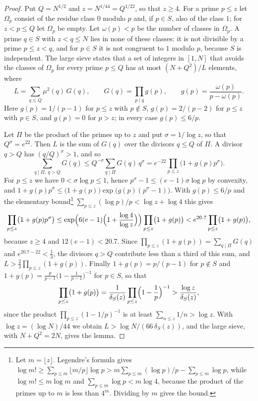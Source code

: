 \documentclass[screen,reqno]{aomart}
\numberwithin{equation}{section}
\theoremstyle{plain}
\theoremstyle{definition}
\theoremstyle{remark}
\begin{document}
\begin{proof}
Put $Q=N^{1/2}$ and $z=N^{1/44}=Q^{1/22}$, so that $z\ge4$. For a prime
$p\le z$ let $\Omega_p$ consist of the residue class $0$ modulo $p$
and, if $p\in S$, also of the class $1$; for $z<p\le Q$ let $\Omega_p$
be empty. Let $\omega(p)<p$ be the number of classes in $\Omega_p$. A
prime $q\in S$ with $z<q\le N$ lies in none of these classes: it is
not divisible by a prime $p\le z<q$, and for $p\in S$ it is not
congruent to $1$ modulo $p$, because $S$ is independent. The large
sieve \cite{Mon68,MV73} states that a set of integers in $[1,N]$ that
avoids the classes of $\Omega_p$ for every prime $p\le Q$ has at most
$(N+Q^2)/L$ elements, where
\[
  L=\sum_{q\le Q}\mu^2(q)\,G(q),\qquad G(q)=\prod_{p\mid q}g(p),\qquad
  g(p)=\frac{\omega(p)}{p-\omega(p)} .
\]
Here $g(p)=1/(p-1)$ for $p\le z$ with $p\notin S$, $g(p)=2/(p-2)$ for
$p\le z$ with $p\in S$, and $g(p)=0$ for $p>z$; in every case
$g(p)\le6/p$.

Let $\Pi$ be the product of the primes up to $z$ and put
$\sigma=1/\log z$, so that $Q^{\sigma}=e^{22}$. Then $L$ is the sum of
$G(q)$ over the divisors $q\le Q$ of $\Pi$. A divisor $q>Q$ has
$(q/Q)^{\sigma}>1$, and so
\[
  \sum_{q\mid\Pi,\ q>Q}G(q)\le Q^{-\sigma}\sum_{q\mid\Pi}G(q)\,q^{\sigma}
  =e^{-22}\prod_{p\le z}\bigl(1+g(p)p^{\sigma}\bigr).
\]
For $p\le z$ we have $0<\sigma\log p\le1$, hence
$p^{\sigma}-1\le(e-1)\sigma\log p$ by convexity, and
$1+g(p)p^{\sigma}\le\bigl(1+g(p)\bigr)\exp\bigl(g(p)(p^{\sigma}-1)\bigr)$.
With $g(p)\le6/p$ and the elementary bound\footnote{Let
$m=\lfloor z\rfloor$. Legendre's formula gives
$\log m!\ge\sum_{p\le m}\lfloor m/p\rfloor\log p
>m\sum_{p\le m}(\log p)/p-\sum_{p\le m}\log p$, while
$\log m!\le m\log m$ and $\sum_{p\le m}\log p<m\log4$, because the
product of the primes up to $m$ is less than $4^m$. Dividing by $m$
gives the bound.}
$\sum_{p\le z}(\log p)/p<\log z+\log4$ this gives
\[
  \prod_{p\le z}\bigl(1+g(p)p^{\sigma}\bigr)
  \le\exp\Bigl(6(e-1)\Bigl(1+\frac{\log4}{\log z}\Bigr)\Bigr)
  \prod_{p\le z}\bigl(1+g(p)\bigr)
  <e^{20.7}\prod_{p\le z}\bigl(1+g(p)\bigr),
\]
because $z\ge4$ and $12(e-1)<20.7$. Since
$\prod_{p\le z}(1+g(p))=\sum_{q\mid\Pi}G(q)$ and $e^{20.7-22}<\frac13$,
the divisors $q>Q$ contribute less than a third of this sum, and
$L>\frac23\prod_{p\le z}(1+g(p))$. Finally $1+g(p)=p/(p-1)$ for
$p\notin S$ and $1+g(p)=\frac p{p-1}\bigl(1-\frac1{p-1}\bigr)^{-1}$ for
$p\in S$, so that
\[
  \prod_{p\le z}\bigl(1+g(p)\bigr)
  =\frac1{\delta_S(z)}\prod_{p\le z}\Bigl(1-\frac1p\Bigr)^{-1}
  >\frac{\log z}{\delta_S(z)},
\]
since the product $\prod_{p\le z}(1-1/p)^{-1}$ is at least
$\sum_{n\le z}1/n>\log z$. With $\log z=(\log N)/44$ we obtain
$L>\log N/(66\,\delta_S(z))$, and the large sieve, with $N+Q^2=2N$,
gives the lemma.
\end{proof}
\end{document}
